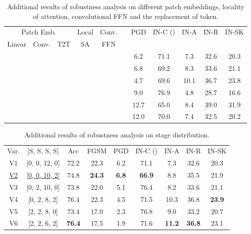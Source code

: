 \documentclass[10pt,twocolumn,letterpaper]{article}
\makeatletter
\newcommand{\cmark}{\ding{51}}\newcommand{\tabincell}[2]{\begin{tabular}{@{}#1@{}}#2\end{tabular}}
\makeatother
\begin{document}
\begin{table*}[h]
\footnotesize
    \centering

\begin{tabular}{c|c|c|c|c|c|c|c|c|c|c}
  \toprule
  \multicolumn{3}{c|}{Patch Emb.} 
  & Local & Conv. & \multirow{2}{*}{} &  \multirow{2}{*}{PGD}&
		\multirow{2}{*}{IN-C ()}&
		\multirow{2}{*}{IN-A}&
		\multirow{2}{*}{IN-R}&
		\multirow{2}{*}{IN-SK}\\
  Linear & Conv. & T2T & SA & FFN & & & & & \\
  \midrule
  \cmark & &  &  & & \cmark & 6.2 & 71.1 & 7.3 & 32.6 & 20.3 \\
  & \cmark & &  & & \cmark & 6.8 & 69.2 & 8.3 & 33.6 & 21.1\\
  &  & \cmark &  & & \cmark & 4.7 & 69.6 & 10.1 & 36.7 & 23.8\\
  \cmark &  & & \cmark  &  & \cmark & 9.0 & 76.9 & 4.8 & 28.7 & 16.6 \\
  \cmark &  & & & \cmark & \cmark & 12.7 & 65.0 & 8.4 & 39.0 & 31.9\\
  \cmark &  & &  &  &  & 12.0 & 70.0 & 7.4 & 32.5 & 20.2 \\
  \bottomrule
  \end{tabular}
  \vspace{2mm}
    \caption{Additional results of robustness analysis on different patch embeddings, locality of attention, convolutional FFN and the replacement of  token.}
    \label{tab:appendix_others}
\end{table*}

\begin{table*}[h]
\footnotesize
    \centering

\begin{tabular}{c|c|c|c|c|c|c|c|c}
        \toprule
		\multirow{2}{*}{Var.} &\multirow{2}{*}{{[{S}, {S}, {S}, {S}]}} &  \multirow{2}{*}{Acc} & \multirow{2}{*}{FGSM} & \multirow{2}{*}{PGD}&
		\multirow{2}{*}{IN-C ()}&
		\multirow{2}{*}{IN-A}&
		\multirow{2}{*}{IN-R}&
		\multirow{2}{*}{IN-SK}\\
		& & & & & & & &\\
			\midrule
			V1 & [0, 0, 12, 0] & 72.2 & 22.3 & 6.2 & 71.1 & 7.3 & 32.6 & 20.3 \\ 
			\underline{V2} & \underline{[0, 0, 10, 2]} & 74.8 & \textbf{24.3} & \textbf{6.8} & \textbf{66.9} & 8.8 & 35.5 & 21.9\\ 
			V3 & [0, 2, 10, 0] & 73.8 & 22.0 & 5.1 & 76.4 & 8.2 & 33.6 & 21.1  \\ 
			V4 & [0, 2, 8, 2] & 76.4 &  22.3 & 4.5 & 71.5 & 10.3 & 36.8 & \textbf{23.9} \\ 
			V5 & [2, 2, 8, 0] & 73.4 & 17.0 & 2.3 & 76.8 & 9.0 & 33.2 & 20.7 \\ 
			V6 & [2, 2, 6, 2] & \textbf{76.4} & 17.5 & 1.9 & 71.6 & \textbf{11.2} & \textbf{36.8} & 23.1 \\ 
			\bottomrule
  \end{tabular}
  \vspace{2mm}
    \caption{Additional results of robustness analysis on stage distribution.}
    \label{tab:appendix_stage}
\end{table*}
\end{document}
